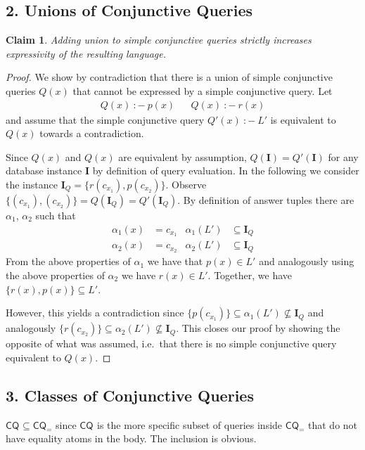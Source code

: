 \documentclass[a4paper,12pt]{article}
\newtheorem{claim}{Claim}
\newcommand{\cq}[1]{\ensuremath{\mathsf{CQ}_{#1}}}
\newcommand{\query}[3]{\ensuremath{{#1}({#2})\:{:}{-}\:{#3}}}
\begin{document}
\subsection*{2. Unions of Conjunctive Queries}

\begin{claim}
Adding union to simple conjunctive queries strictly increases expressivity of the resulting language.
\end{claim}

\begin{proof}
We show by contradiction that there is a union of simple conjunctive queries $Q(x)$ that cannot be expressed by a simple conjunctive query. Let
\begin{align*}
\query{Q}{x}{p(x)} && \query{Q}{x}{r(x)}
\end{align*}
and assume that the simple conjunctive query $\query{Q'}{x}{L'}$ is equivalent to $Q(x)$ towards a contradiction.

Since $Q(x)$ and $Q(x)$ are equivalent by assumption, $Q(\textbf{I}) = Q'(\textbf{I})$ for any database instance $\textbf{I}$ by definition of query evaluation. In the following we consider the instance $\textbf{I}_Q = \{ r(c_{x_1}), p(c_{x_2}) \}$. Observe $\{ (c_{x_1}), (c_{x_2}) \} = Q(\textbf{I}_Q) = Q'(\textbf{I}_Q)$. By definition of answer tuples there are $\alpha_1$, $\alpha_2$ such that
\begin{align*}
\alpha_1(x) &= c_{x_1} &
\alpha_1(L') &\subseteq \textbf{I}_Q \\
\alpha_2(x) &= c_{x_2} &
\alpha_2(L') &\subseteq \textbf{I}_Q
\end{align*}
From the above properties of $\alpha_1$ we have that $p(x) \in L'$ and analogously using the above properties of $\alpha_2$ we have $r(x) \in L'$. Together, we have $\{ r(x), p(x) \} \subseteq L'$.

However, this yields a contradiction since $\{p(c_{x_1})\} \subseteq \alpha_1(L') \not \subseteq \textbf{I}_Q$ and analogously $\{r(c_{x_2})\} \subseteq \alpha_2(L') \not \subseteq \textbf{I}_Q$. This closes our proof by showing the opposite of what was assumed, i.e.\ that there is no simple conjunctive query equivalent to $Q(x)$.
\end{proof}

\subsection*{3. Classes of Conjunctive Queries}

$\cq{} \subseteq \cq{=}$ since \cq{} is the more specific subset of queries inside \cq{=} that do not have equality atoms in the body. The inclusion is obvious.
\end{document}
